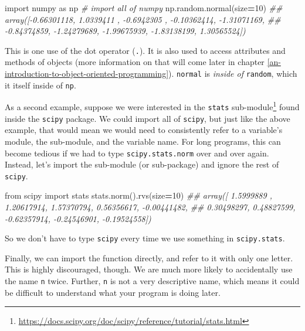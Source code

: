 \documentclass[
  12pt,
]{krantz}
\makeatletter
\newenvironment{Shaded}{\begin{snugshade}}{\end{snugshade}}
\newcommand{\CommentTok}[1]{\textcolor[rgb]{0.37,0.37,0.37}{\textit{#1}}}
\newcommand{\DecValTok}[1]{\textcolor[rgb]{0.06,0.06,0.06}{#1}}
\newcommand{\ImportTok}[1]{#1}
\newcommand{\NormalTok}[1]{#1}
\newcommand{\OperatorTok}[1]{\textcolor[rgb]{0.43,0.43,0.43}{\textbf{#1}}}
\renewcommand{\href}[2]{#2\footnote{\url{#1}}}
\newenvironment{kframe}{%
\medskip{}
\setlength{\fboxsep}{.8em}
 \def\at@end@of@kframe{}%
 \ifinner\ifhmode%
  \def\at@end@of@kframe{\end{minipage}}%
  \begin{minipage}{\columnwidth}%
 \fi\fi%
 \def\FrameCommand##1{\hskip\@totalleftmargin \hskip-\fboxsep
 \colorbox{shadecolor}{##1}\hskip-\fboxsep
     \hskip-\linewidth \hskip-\@totalleftmargin \hskip\columnwidth}%
 \MakeFramed {\advance\hsize-\width
   \@totalleftmargin\z@ \linewidth\hsize
   \@setminipage}}%
 {\par\unskip\endMakeFramed%
 \at@end@of@kframe}
\renewenvironment{Shaded}{\begin{kframe}}{\end{kframe}}
\makeatother
\begin{document}
\begin{Shaded}
\begin{Highlighting}[]
\ImportTok{import}\NormalTok{ numpy }\ImportTok{as}\NormalTok{ np }\CommentTok{\# import all of numpy}
\NormalTok{np.random.normal(size}\OperatorTok{=}\DecValTok{10}\NormalTok{)}
\CommentTok{\#\# array([{-}0.66301118,  1.0339411 , {-}0.6942305 , {-}0.10362414, {-}1.31071169,}
\CommentTok{\#\#        {-}0.84374859, {-}1.24279689, {-}1.99675939, {-}1.83138199,  1.30565524])}
\end{Highlighting}
\end{Shaded}

This is one use of the dot operator (\texttt{.}). It is also used to access attributes and methods of objects (more information on that will come later in chapter \ref{an-introduction-to-object-oriented-programming}). \texttt{normal} is \emph{inside of} \texttt{random}, which it itself inside of \texttt{np}.

As a second example, suppose we were interested in the \href{https://docs.scipy.org/doc/scipy/reference/tutorial/stats.html}{\texttt{stats} sub-module} found inside the \texttt{scipy} package. We could import all of \texttt{scipy}, but just like the above example, that would mean we would need to consistently refer to a variable's module, the sub-module, and the variable name. For long programs, this can become tedious if we had to type \texttt{scipy.stats.norm} over and over again. Instead, let's import the sub-module (or sub-package) and ignore the rest of \texttt{scipy}.

\begin{Shaded}
\begin{Highlighting}[]
\ImportTok{from}\NormalTok{ scipy }\ImportTok{import}\NormalTok{ stats}
\NormalTok{stats.norm().rvs(size}\OperatorTok{=}\DecValTok{10}\NormalTok{)}
\CommentTok{\#\# array([ 1.5999889 ,  1.20617914,  1.57370794,  0.56356617, {-}0.00441482,}
\CommentTok{\#\#         0.30498297,  0.48827599, {-}0.62357914, {-}0.24546901, {-}0.19524558])}
\end{Highlighting}
\end{Shaded}

So we don't have to type \texttt{scipy} every time we use something in \texttt{scipy.stats}.

Finally, we can import the function directly, and refer to it with only one letter. This is highly discouraged, though. We are much more likely to accidentally use the name \texttt{n} twice. Further, \texttt{n} is not a very descriptive name, which means it could be difficult to understand what your program is doing later.
\end{document}
